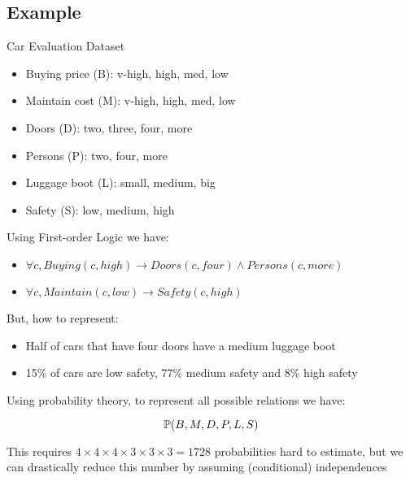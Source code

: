 \subsection{Example}
	\begin{frame}
		\begin{block}{Car Evaluation Dataset}
			\begin{itemize}
				\item Buying price (B): v-high, high, med, low
				\item Maintain cost (M): v-high, high, med, low
				\item Doors (D): two, three, four, more
				\item Persons (P): two, four, more
				\item Luggage boot (L): small, medium, big
				\item Safety (S): low, medium, high
			\end{itemize}
		\end{block}
	\end{frame}
	
	\begin{frame}
		Using First-order Logic we have:
		\begin{block}{}
			\begin{itemize}
				\item $\forall c, {Buying}( c , high ) \rightarrow {Doors}( c , four ) \land {Persons}( c , more )$
				\item $\forall c, {Maintain}( c , low ) \rightarrow {Safety}( c , high )$
			\end{itemize}
		\end{block}
		But, how to represent:
		\begin{block}{}
			\begin{itemize}
				\item Half of cars that have four doors have a medium luggage boot
				\item 15\% of cars are low safety, 77\% medium safety and 8\% high safety
			\end{itemize}
		\end{block}
	\end{frame}
	
	\begin{frame}
		Using probability theory, to represent all possible relations we have:
		\begin{block}{}
			\[ \P( B , M , D , P , L , S ) \]
		\end{block}
		This requires $4 \times 4 \times 4 \times 3 \times 3 \times 3 = 1728$ probabilities hard to estimate, but we can drastically reduce this number by assuming (conditional) independences
	\end{frame}
	
